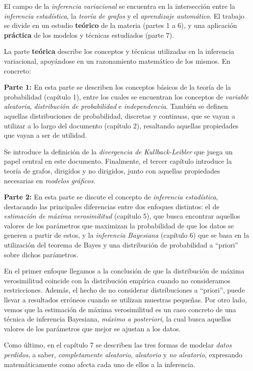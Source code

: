 
El campo de la \emph{inferencia variacional} se encuentra en la intersección entre la \emph{inferencia estadística}, la \emph{teoría de grafos} y el \emph{aprendizaje automático}. El trabajo se divide en un estudio \textbf{teórico} de la materia (partes 1 a 6), y una aplicación \textbf{práctica} de los modelos y técnicas estudiados (parte 7).

La parte \textbf{teórica} describe los conceptos y técnicas utilizadas en la inferencia variacional, apoyándose en un razonamiento matemático de los mismos. En concreto:

\textbf{Parte 1:} En esta parte se describen los conceptos básicos de la teoría de la probabilidad (capítulo 1), entre los cuales se encuentran los conceptos de \emph{variable aleatoria}, \emph{distribución de probabilidad} e \emph{independencia}. También se definen aquellas distribuciones de probabilidad, discretas y continuas, que se vayan a utilizar a lo largo del documento (capítulo 2), resaltando aquellas propiedades que vayan a ser de utilidad.

Se introduce la definición de la \emph{divergencia de Kullback-Leibler} que juega un papel central en este documento. Finalmente, el tercer capítulo introduce la teoría de grafos, dirigidos y no dirigidos, junto con aquellas propiedades necesarias en \emph{modelos gráficos}.

\textbf{Parte 2:} En esta parte se discute el concepto de \emph{inferencia estadística}, destacando las principales diferencias entre dos enfoques distintos: el de \emph{estimación de máxima verosimilitud} (capítulo 5), que busca encontrar aquellos valores de los parámetros que maximizan la probabilidad de que los datos se generen a partir de estos, y la \emph{inferencia Bayesiana} (capítulo 6) que se basa en la utilización del teorema de Bayes y una distribución de probabilidad a ``priori'' sobre dichos parámetros.

En el primer enfoque llegamos a la conclusión de que la distribución de máxima verosimilitud coincide con la distribución empírica cuando no consideramos restricciones. Además, el hecho de no considerar distribuciones a ``priori'', puede llevar a resultados erróneos cuando se utilizan muestras pequeñas. Por otro lado, vemos que la estimación de máxima verosimilitud es un caso concreto de una técnica de inferencia Bayesiana, \emph{máximo a posteriori}, la cual busca aquellos valores de los parámetros que mejor se ajustan a los datos.

Como último, en el capítulo 7 se describen las tres formas de modelar \emph{datos perdidos}, a saber, \emph{completamente aleatorio}, \emph{aleatorio} y \emph{no aleatorio}, expresando matemáticamente como afecta cada uno de ellos a la inferencia.

